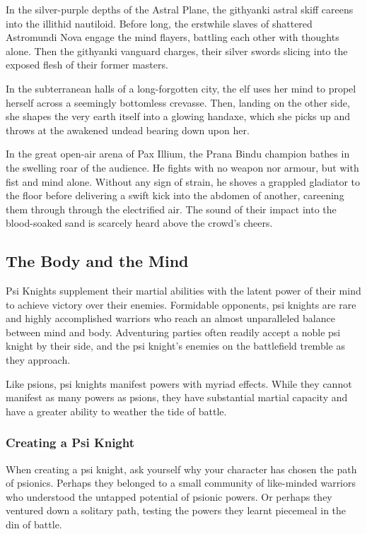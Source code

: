 In the silver-purple depths of the Astral Plane,
the githyanki astral skiff careens into the illithid nautiloid.
Before long, the erstwhile slaves of shattered Astromundi Nova
engage the mind flayers,
battling each other with thoughts alone.
Then the githyanki vanguard charges,
their silver swords slicing into the exposed flesh of their former
masters.

In the subterranean halls of a long-forgotten city,
the elf uses her mind to propel herself across a seemingly
bottomless crevasse.
Then, landing on the other side,
she shapes the very earth itself into a glowing handaxe,
which she picks up and throws at the awakened undead
bearing down upon her.

In the great open-air arena of Pax Illium,
the Prana Bindu champion bathes in the swelling roar
of the audience.
He fights with no weapon nor armour,
but with fist and mind alone.
Without any sign of strain,
he shoves a grappled gladiator to the floor
before delivering a swift kick into the abdomen of another,
careening them through through the electrified air.
The sound of their impact into the blood-soaked sand
is scarcely heard above the crowd's cheers.

\subsection{The Body and the Mind}
Psi Knights supplement their martial abilities
with the latent power of their mind to
achieve victory over their enemies.
Formidable opponents,
psi knights are rare and highly accomplished warriors
who reach an almost unparalleled balance between mind
and body.
Adventuring parties often readily accept a noble psi knight
by their side,
and the psi knight's enemies on the battlefield tremble
as they approach.

Like psions, psi knights manifest powers with myriad effects.
While they cannot manifest as many powers as psions,
they have substantial martial capacity
and have a greater ability to weather the tide of battle. 

\subsubsection{Creating a Psi Knight}
When creating a psi knight,
ask yourself why your character has chosen the path of psionics.
Perhaps they belonged to a small community of like-minded warriors
who understood the untapped potential of psionic powers.
Or perhaps they ventured down a solitary path,
testing the powers they learnt piecemeal in the din of battle.

